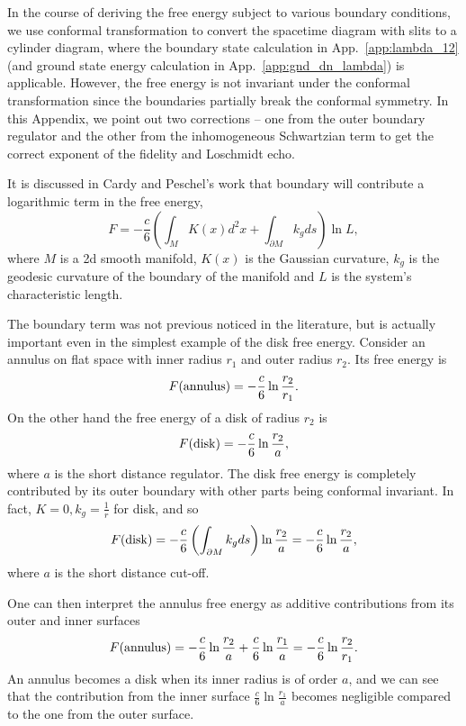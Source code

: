 
In the course of deriving the free energy subject to various boundary conditions, we use conformal transformation to convert the spacetime diagram with slits to a cylinder diagram, where the boundary state calculation in App.~\ref{app:lambda_12} (and ground state energy calculation in App.~\ref{app:gnd_dn_lambda}) is applicable. However, the free energy is not invariant under the conformal transformation since the boundaries partially break the conformal symmetry. In this Appendix, we point out two corrections -- one from the outer boundary regulator and the other from the inhomogeneous Schwartzian term to get the correct exponent of the fidelity and Loschmidt echo. 

It is discussed in Cardy and Peschel's work\cite{cardy_finite-size_1988} that boundary will contribute a logarithmic term in the free energy,
\begin{equation}
F = - \frac{c}{6} \left( \int_M  K(x) d^2x + \int_{\partial M} k_g ds \right)  \ln L , 
\end{equation}
where $M$ is a 2d smooth manifold, $K(x)$ is the Gaussian curvature, $k_g$ is the geodesic curvature of the boundary of the manifold and $L$ is the system's characteristic length. 

The boundary term was not previous noticed in the literature, but is actually important even in the simplest example of the disk free energy. Consider an annulus on flat space with inner radius $r_1$ and outer radius $r_2$. Its free energy is
\begin{equation}
F({\rm annulus}) = -  \frac{c}{6} \ln \frac{r_2}{r_1} .
\end{equation}
On the other hand the free energy of a disk of radius $r_2$ is
\begin{equation}
  F( {\rm disk} ) = - \frac{c}{6} \ln \frac{r_2}{a},
\end{equation}
where $a$ is the short distance regulator. The disk free energy is completely contributed by its outer boundary with other parts being conformal invariant. In fact, $K = 0, k_g = \frac{1}{r}$ for disk, and so 
\begin{equation}
F( {\rm disk}  ) = - \frac{c}{6}  \left( \int_{\partial M} k_g ds \right)  \ln \frac{r_2}{a}  = - \frac{c}{6}  \ln \frac{r_2}{a} , 
\end{equation}
where $a$ is the short distance cut-off. 

One can then interpret the annulus free energy as additive contributions from its outer and inner surfaces
\begin{equation}
F( {\rm annulus} ) = -  \frac{c}{6} \ln \frac{r_2}{a} +  \frac{c}{6} \ln \frac{r_1}{a} = - \frac{c}{6} \ln \frac{r_2}{r_1}.
\end{equation}
An annulus becomes a disk when its inner radius is of order $a$, and we can see that the contribution from the inner surface $\frac{c}{6} \ln \frac{r_1}{a}$ becomes negligible compared to the one from the outer surface.  

